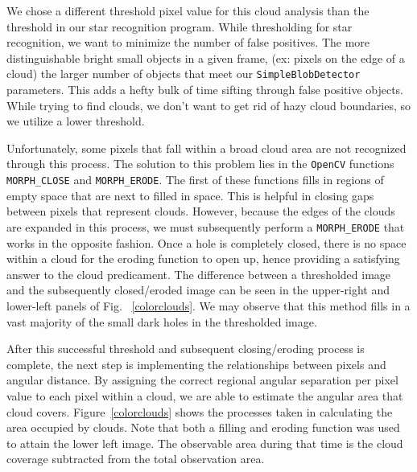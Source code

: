 We chose a different threshold pixel value for this cloud analysis than the threshold in our star recognition program.
While thresholding for star recognition, we want to minimize the number of false positives.
The more distinguishable bright small objects in a given frame, (ex: pixels on the edge of a cloud) the larger number of objects that meet our \texttt{SimpleBlobDetector} parameters.
This adds a hefty bulk of time sifting through false positive objects.
While trying to find clouds, we don't want to get rid of hazy cloud boundaries, so we utilize a lower threshold.

Unfortunately, some pixels that fall within a broad cloud area are not recognized through this process.
The solution to this problem lies in the \texttt{OpenCV} functions \texttt{MORPH\_CLOSE} and \texttt{MORPH\_ERODE}.
The first of these functions fills in regions of empty space that are next to filled in space.
This is helpful in closing gaps between pixels that represent clouds.
However, because the edges of the clouds are expanded in this process, we must subsequently perform a \texttt{MORPH\_ERODE} that works in the opposite fashion.
Once a hole is completely closed, there is no space within a cloud for the eroding function to open up, hence providing a satisfying answer to the cloud predicament. 
The difference between a thresholded image and the subsequently closed/eroded image can be seen in the upper-right and lower-left panels of Fig. ~\ref{colorclouds}.
We may observe that this method fills in a vast majority of the small dark holes in the thresholded image.

After this successful threshold and subsequent closing/eroding process is complete, the next step is implementing the relationships between pixels and angular distance.
By assigning the correct regional angular separation per pixel value to each pixel within a cloud, we are able to estimate the angular area that cloud covers.
Figure~\ref{colorclouds} shows the processes taken in calculating the area occupied by clouds.
Note that both a filling and eroding function was used to attain the lower left image.
The observable area during that time is the cloud coverage subtracted from the total observation area.



